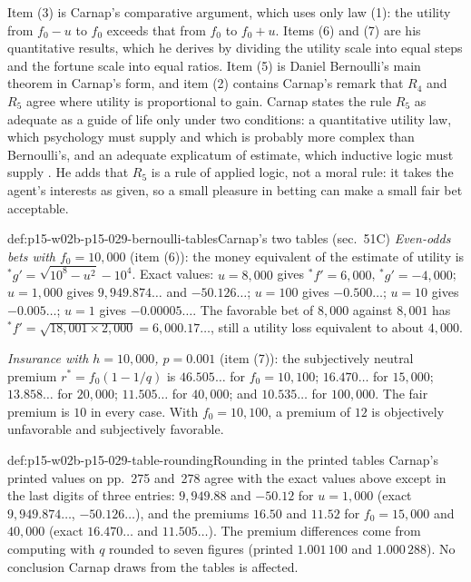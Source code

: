 Item (3) is Carnap's comparative argument, which uses only law (1):
the utility from \(f_0-u\) to \(f_0\) exceeds that from \(f_0\) to
\(f_0+u\). Items (6) and (7) are his quantitative results, which he
derives by dividing the utility scale into equal steps and the fortune
scale into equal ratios. Item (5) is Daniel Bernoulli's main theorem in
Carnap's form, and item (2) contains Carnap's remark that \(R_4\) and
\(R_5\) agree where utility is proportional to gain. Carnap states the
rule \(R_5\) as adequate as a guide of life only under two conditions:
a quantitative utility law, which psychology must supply and which is
probably more complex than Bernoulli's, and an adequate explicatum of
estimate, which inductive logic must supply \cite[sec.~51C, pp.~278--279]{Carnap1950Probability}.
He adds that \(R_5\) is a rule of applied logic, not a moral rule: it
takes the agent's interests as given, so a small pleasure in betting can
make a small fair bet acceptable.

\begin{hbexample}{def:p15-w02b-p15-029-bernoulli-tables}{Carnap's two tables (sec.~51C)}
\emph{Even-odds bets with \(f_0=10{,}000\)} (item (6)): the money
equivalent of the estimate of utility is
\({}^*g'=\sqrt{10^8-u^2}-10^4\). Exact values: \(u=8{,}000\) gives
\({}^*f'=6{,}000\), \({}^*g'=-4{,}000\); \(u=1{,}000\) gives
\(9{,}949.874\ldots\) and \(-50.126\ldots\); \(u=100\) gives
\(-0.500\ldots\); \(u=10\) gives \(-0.005\ldots\); \(u=1\) gives
\(-0.00005\ldots\). The favorable bet of \(8{,}000\) against \(8{,}001\)
has \({}^*f'=\sqrt{18{,}001\times2{,}000}=6{,}000.17\ldots\), still a
utility loss equivalent to about \(4{,}000\).

\emph{Insurance with \(h=10{,}000\), \(p=0.001\)} (item (7)): the
subjectively neutral premium \(r^*=f_0(1-1/q)\) is \(46.505\ldots\) for
\(f_0=10{,}100\); \(16.470\ldots\) for \(15{,}000\); \(13.858\ldots\)
for \(20{,}000\); \(11.505\ldots\) for \(40{,}000\); and \(10.535\ldots\)
for \(100{,}000\). The fair premium is \(10\) in every case. With
\(f_0=10{,}100\), a premium of \(12\) is objectively unfavorable and
subjectively favorable.
\end{hbexample}

\begin{hbwarning}{def:p15-w02b-p15-029-table-rounding}{Rounding in the printed tables}
Carnap's printed values on pp.~275 and~278 agree with the exact values
above except in the last digits of three entries: \(9{,}949.88\) and
\(-50.12\) for \(u=1{,}000\) (exact \(9{,}949.874\ldots\),
\(-50.126\ldots\)), and the premiums \(16.50\) and \(11.52\) for
\(f_0=15{,}000\) and \(40{,}000\) (exact \(16.470\ldots\) and
\(11.505\ldots\)). The premium differences come from computing with
\(q\) rounded to seven figures (printed \(1.001\,100\) and
\(1.000\,288\)). No conclusion Carnap draws from the tables is
affected.
\end{hbwarning}

